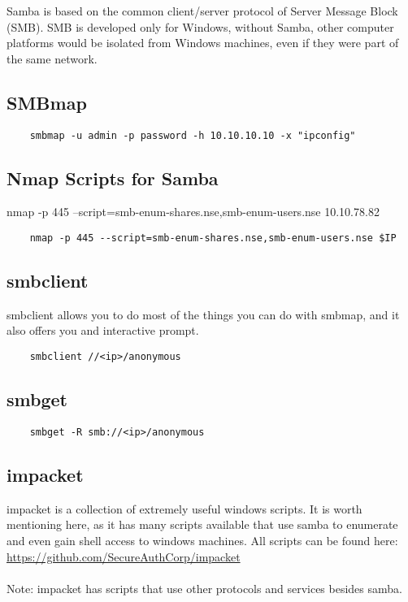 \documentclass[12pt,a4paper]{scrartcl}
\begin{document}
Samba is based on the common client/server protocol of Server Message Block (SMB). SMB is developed only for Windows, without Samba, other computer platforms would be isolated from Windows machines, even if they were part of the same network.
\subsection{SMBmap}
\begin{lstlisting}
	smbmap -u admin -p password -h 10.10.10.10 -x "ipconfig"
\end{lstlisting}

\subsection{Nmap Scripts for Samba}
nmap -p 445 --script=smb-enum-shares.nse,smb-enum-users.nse 10.10.78.82
\begin{lstlisting}
	nmap -p 445 --script=smb-enum-shares.nse,smb-enum-users.nse $IP
\end{lstlisting}

\subsection{smbclient}
smbclient allows you to do most of the things you can do with smbmap, and it also offers you and interactive prompt.
\begin{lstlisting}
	smbclient //<ip>/anonymous
\end{lstlisting}

\subsection{smbget}
\begin{lstlisting}
	smbget -R smb://<ip>/anonymous
\end{lstlisting}

\subsection{impacket}
impacket is a collection of extremely useful windows scripts. It is worth mentioning here, as it has many scripts available that use samba to enumerate and even gain shell access to windows machines. All scripts can be found here:\\ \url{https://github.com/SecureAuthCorp/impacket}\\\\
Note: impacket has scripts that use other protocols and services besides samba.
\end{document}
